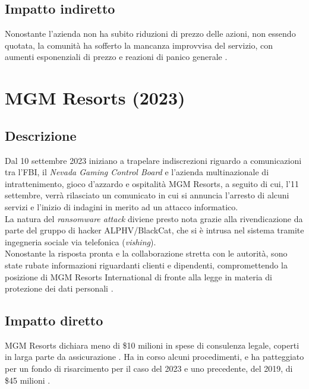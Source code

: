 \documentclass[12pt,a4paper,twoside]{report}
\begin{document}
\subsection{Impatto indiretto}
Nonostante l'azienda non ha subito riduzioni di prezzo delle azioni, non essendo quotata, la comunit\`a ha sofferto la mancanza improvvisa del servizio, con aumenti esponenziali di prezzo e reazioni di panico generale \cite{ColonialPipe_context}.\\


\section{MGM Resorts (2023)}
\subsection{Descrizione}
Dal 10 settembre 2023 iniziano a trapelare indiscrezioni riguardo a comunicazioni tra l'FBI, il \textit{Nevada Gaming Control Board} e l'azienda multinazionale di intrattenimento, gioco d'azzardo e ospitalit\`a MGM Resorts, a seguito di cui, l'11 settembre, verr\`a rilasciato un comunicato in cui si annuncia l'arresto di alcuni servizi e l'inizio di indagini in merito ad un attacco informatico.\\
La natura del \textit{ransomware attack} diviene presto nota grazie alla rivendicazione da parte del gruppo di hacker ALPHV/BlackCat, che si \`e intrusa nel sistema tramite ingegneria sociale via telefonica (\textit{vishing}).\\
Nonostante la risposta pronta e la collaborazione stretta con le autorit\`a, sono state rubate informazioni riguardanti clienti e dipendenti, compromettendo la posizione di MGM Resorts International di fronte alla legge in materia di protezione dei dati personali \cite{MGMResorts_cybnews}.\\
\subsection{Impatto diretto}
MGM Resorts dichiara meno di \$10 milioni in spese di consulenza legale, coperti in larga parte da assicurazione \cite{MGM_8k_2023}. Ha in corso alcuni procedimenti, e ha patteggiato per un fondo di risarcimento per il caso del 2023 e uno precedente, del 2019, di \$45 milioni \cite{mgm_settlement}.  
\end{document}
